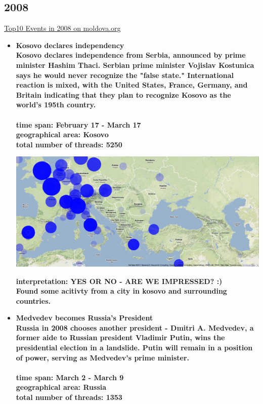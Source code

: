 \documentclass[11pt,a4paper,english]{article}
\begin{document}
			\subsection{2008}
			\href{http://social.moldova.org/news/10-most-important-world-events-of-2008-217389-eng.html}{Top10 Events in 2008 on moldova.org}
				\begin{itemize}
					\item \bf Kosovo declares independency \rm
						\\ Kosovo declares independence from Serbia, announced by prime minister Hashim Thaci. Serbian prime minister Vojislav Kostunica says he would never recognize the "false state." International reaction is mixed, with the United States, France, Germany, and Britain indicating that they plan to recognize Kosovo as the world's 195th country.
						\\\\ \bf time span: \rm February 17 - March 17
						\\ \bf geographical area: \rm Kosovo
						\\ \bf total number of threads: \rm 5250
					
						\includegraphics[width=130mm]{img/post-kosovo}
						
						\bf interpretation: \rm YES OR NO - ARE WE IMPRESSED? :)
						\\ Found some acitivty from a city in kosovo and surrounding countries.
						
						
						
					\item \bf Medvedev becomes Russia's President \rm
						\\ Russia in 2008 chooses another president - Dmitri A. Medvedev, a former aide to Russian president Vladimir Putin, wins the presidential election in a landslide. Putin will remain in a position of power, serving as Medvedev's prime minister.
						\\\\ \bf time span: \rm March 2 - March 9
						\\ \bf geographical area: \rm Russia
						\\ \bf total number of threads: \rm 1353
						

\end{itemize}
\end{document}
